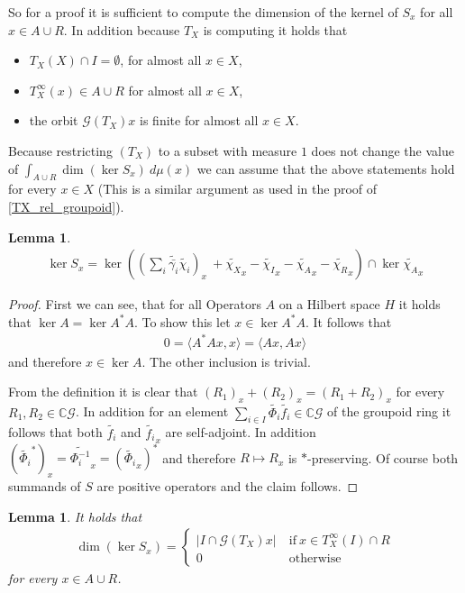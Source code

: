\documentclass[12pt,a4paper]{scrartcl}
\theoremstyle{plain}
\newtheorem{Lemma}[Theorem]{Lemma}
\theoremstyle{definition}
\newcommand{\C}{\mathbb{C}} %
\newcommand{\2}{\mathbb{Z} / 2 \mathbb{Z}}
\newcommand{\G}{\mathcal{G}}
\newcommand{\1}{\bar{1}}
\newcommand{\0}{\bar{0}}
\begin{document}
So for a proof it is sufficient to compute the dimension of the kernel of $S_x$ for all $x \in A \cup R$. In addition because $T_X$ is computing it holds that
\begin{itemize}
	\item $T_X(X) \cap I= \emptyset$, for almost all $x \in X$,
	\item $T_X^\infty(x) \in A \cup R$ for almost all $x \in X$,
	\item the orbit $\G (T_X)x$ is finite for almost all $x \in X$.
\end{itemize}
Because restricting $(T_X)$ to a subset with measure $1$ does not change the value of $\int_{A \cup R} \dim (\ker S_x) \ d \mu (x)$ we can assume that the above statements hold for every $x \in X$ (This is a similar argument as used in the proof of \ref{TX_rel_groupoid}).
\begin{Lemma}
	\begin{align*}
	\ker S_x = \ker((\sum_{i} \widetilde{\bar{\gamma_i}} \widetilde{\chi_i})_x \ + \widetilde{\chi_X}_x - \widetilde{\chi_I}_x - \widetilde{\chi_A}_x - \widetilde{\chi_R}_x) \cap \ker \widetilde{\chi_A}_x
	\end{align*}
\end{Lemma}
\begin{proof}
	First we can see, that for all Operators $A$ on a Hilbert space $H$ it holds that $\ker A = \ker A^*A$. To show this let $x \in \ker A^*A$. It follows that
	\begin{align*}
		0 = \langle A^*Ax, x \rangle = \langle Ax, Ax \rangle
	\end{align*}
	and therefore $x \in \ker A$. The other inclusion is trivial. 
	
	From the definition it is clear that $(R_1)_x + (R_2)_x = (R_1 + R_2)_x$ for every $R_1, R_2 \in \C \G$. In addition for an element $\sum_{i \in I} \widetilde{\Phi_i} \widetilde{f_i} \in \C\G$ of the  groupoid ring it follows that both $\widetilde{f_i}$ and $\widetilde{f_i}_x$ are self-adjoint. In addition $(\widetilde {\Phi_i}^*)_x = \widetilde {\Phi_i^{-1}}_x = (\widetilde {\Phi_i}_x)^*$  and therefore $R \mapsto R_x$ is $*$-preserving. Of course both summands of $S$ are positive operators and the claim follows.
\end{proof}
\begin{Lemma} \label{kerSx_berechnen}
	It holds that
	\begin{align*}
		\dim (\ker S_x) = \begin{cases}
		|I \cap \G (T_X)x| &~ \text{if} ~ x \in T_X^\infty(I) \cap R\\
		0 &~ \text{otherwise} 
		\end{cases}
	\end{align*}
	for every $x \in A \cup R$.
\end{Lemma}
\end{document}
